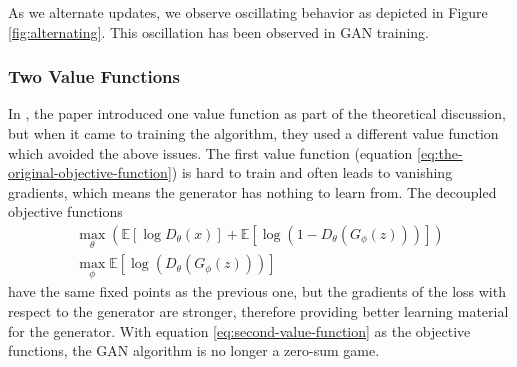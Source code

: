 As we alternate updates, we observe oscillating behavior as depicted
in Figure \ref{fig:alternating}.  This oscillation has been observed
in GAN training.

%
%
%

\subsubsection{Two Value Functions}
\label{sec:two-value}

In \cite{ref:goodfellow-original}, the paper introduced one value
function as part of the theoretical discussion, but when it came to
training the algorithm, they used a different value function which
avoided the above issues. The first value function (equation
\ref{eq:the-original-objective-function}) is hard to train and often
leads to vanishing gradients, which means the generator has nothing to
learn from. The decoupled objective functions
\begin{align}
  \label{eq:second-value-function} \max_{\theta} \left(
  \mathbb{E}\left[\log{D_\theta(x)}\right] +
  \mathbb{E}\left[\log(1 - D_\theta(G_\phi(z)))\right]
  \right) \\
  \max_{\phi}\mathbb{E}\left[\log(D_\theta(G_\phi(z)))\right]
\end{align} have the same fixed points as the previous one, but the
gradients of the loss with respect to the generator are stronger,
therefore providing better learning material for the generator. With
equation \ref{eq:second-value-function} as the objective functions,
the GAN algorithm is no longer a zero-sum game.

